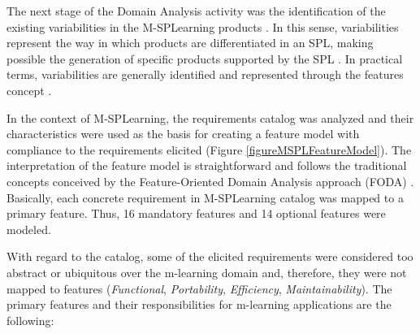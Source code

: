 The next stage of the Domain Analysis activity was the identification of the existing variabilities in the M-SPLearning products \cite{krueger02}. In this sense, variabilities represent the way in which products are differentiated in an SPL, making possible the generation of specific products supported by the SPL \cite{vangurp01}. In practical terms, variabilities are generally identified and represented through the features concept \cite{bosch01, kang90}.

In the context of M-SPLearning, the requirements catalog was analyzed and their characteristics were used as the basis for creating a feature model with compliance to the requirements elicited (Figure \ref{figureMSPLFeatureModel}). The interpretation of the feature model is straightforward and follows the traditional concepts conceived by the Feature-Oriented Domain Analysis approach (FODA) \cite{kang90}. Basically, each concrete requirement in M-SPLearning catalog was mapped to a primary feature. Thus, 16 mandatory features and 14 optional features were modeled.



With regard to the catalog, some of the elicited requirements were considered too abstract or ubiquitous over the m-learning domain and, therefore, they were not mapped to features (\textit{Functional}, \textit{Portability}, \textit{Efficiency}, \textit{Maintainability}). The primary features and their responsibilities for m-learning applications are the following:


